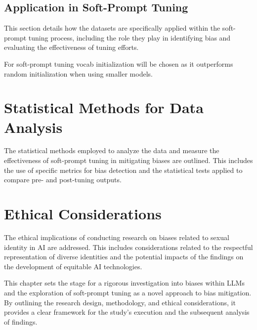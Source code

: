 \subsection{Application in Soft-Prompt Tuning}

This section details how the datasets are specifically applied within the soft-prompt tuning process, including the role they play in identifying bias and evaluating the effectiveness of tuning efforts.


For soft-prompt tuning vocab initialization will be chosen as it outperforms random initialization when using smaller models.

\section{Statistical Methods for Data Analysis}

The statistical methods employed to analyze the data and measure the effectiveness of soft-prompt tuning in mitigating biases are outlined. This includes the use of specific metrics for bias detection and the statistical tests applied to compare pre- and post-tuning outputs.

\section{Ethical Considerations}

The ethical implications of conducting research on biases related to sexual identity in AI are addressed. This includes considerations related to the respectful representation of diverse identities and the potential impacts of the findings on the development of equitable AI technologies.

This chapter sets the stage for a rigorous investigation into biases within LLMs and the exploration of soft-prompt tuning as a novel approach to bias mitigation. By outlining the research design, methodology, and ethical considerations, it provides a clear framework for the study's execution and the subsequent analysis of findings.